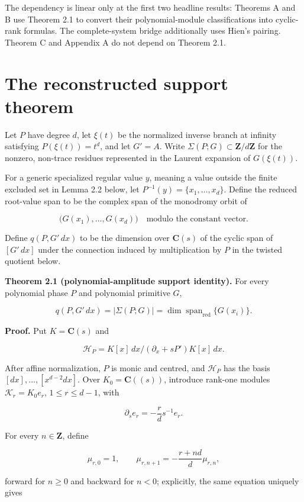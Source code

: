 \documentclass[
  11pt,
  a4paper,
]{amsart}
\begin{document}
The dependency is linear only at the first two headline results:
Theorems A and B use Theorem 2.1 to convert their polynomial-module
classifications into cyclic-rank formulas. The complete-system bridge
additionally uses Hien's pairing. Theorem C and Appendix A do not depend
on Theorem 2.1.

\section{The reconstructed support theorem}

Let \(P\) have degree \(d\), let \(\xi(t)\) be the normalized inverse
branch at infinity satisfying \(P(\xi(t))=t^d\), and let \(G'=A\). Write
\(\Sigma(P;G)\subset\mathbf Z/d\mathbf Z\) for the nonzero, non-trace
residues represented in the Laurent expansion of \(G(\xi(t))\).

For a generic specialized regular value \(y\), meaning a value outside
the finite excluded set in Lemma 2.2 below, let
\(P^{-1}(y)=\{x_1,\ldots,x_d\}\). Define the reduced root-value span to
be the complex span of the monodromy orbit of

\[
\bigl(G(x_1),\ldots,G(x_d)\bigr)
\quad\text{modulo the constant vector}.
\]

Define \(q(P,G'\,dx)\) to be the dimension over \(\mathbf C(s)\) of the
cyclic span of \([G'\,dx]\) under the connection induced by
multiplication by \(P\) in the twisted quotient below.

\textbf{Theorem 2.1 (polynomial-amplitude support identity).} For every
polynomial phase \(P\) and polynomial primitive \(G\),

\[
q(P,G'\,dx)
=|\Sigma(P;G)|
=\dim\operatorname{span}_{\mathrm{red}}\{G(x_i)\}.       \tag{H}
\]

\textbf{Proof.} Put \(K=\mathbf C(s)\) and

\[
\mathcal H_P=K[x]\,dx/(\partial_x+sP')K[x]\,dx.
\]

After affine normalization, \(P\) is monic and centred, and
\(\mathcal H_P\) has the basis \([dx],\ldots,[x^{d-2}dx]\). Over
\(K_0=\mathbf C((s))\), introduce rank-one modules
\(\mathcal K_r=K_0e_r\), \(1\le r\le d-1\), with

\[
\partial_se_r=-\frac rd s^{-1}e_r.
\]

For every \(n\in\mathbf Z\), define

\[
\mu_{r,0}=1,\qquad
\mu_{r,n+1}=-\frac{r+nd}{d}\mu_{r,n},
\]

forward for \(n\ge0\) and backward for \(n<0\); explicitly, the same
equation uniquely gives
\end{document}
